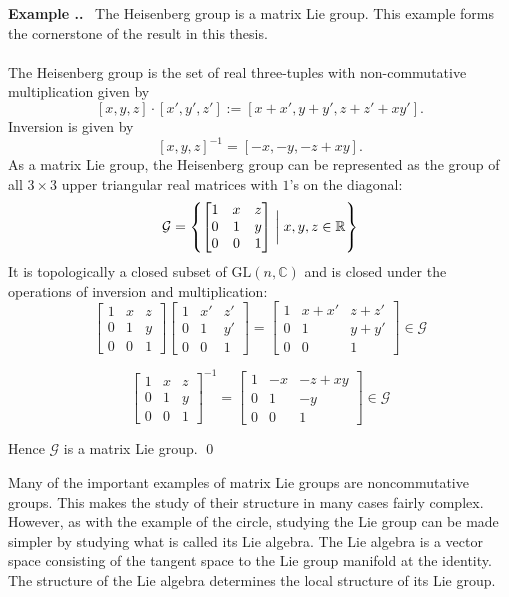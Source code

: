 \documentclass[honours]{UNSWthesis}
\newcommand{\R}{\mathbb{R}}
\newcommand{\C}{\mathbb{C}}
\newcommand{\G}{\mathcal{G}}
\newcommand{\1}{\mathbf{e}_{1}}
\newcommand{\2}{\mathbf{e}_{3}}
\newcommand{\3}{\mathbf{e}_{3}}
\newcounter{Item}[section]
\newenvironment{Example}{\medskip
                            \refstepcounter{Item}
                            \noindent
                           {\bf Example \thesection.\theItem.}\ }
                           {\qed}
\begin{document}
\begin{Example}\label{Heisenberg Group}
The Heisenberg group is a matrix Lie group. This example forms the cornerstone of the result in this thesis.
\paragraph
{\noindent}The Heisenberg group is the set of real three-tuples with non-commutative multiplication given by
\[
[x,y,z]\cdot[x', y', z'] := [x+x', y+y', z+z' + xy'].
\]
Inversion is given by 
\[ [x,y,z]^{-1}= [-x, -y, -z+xy] .\]
As a matrix Lie group, the Heisenberg group can be represented as the group of all $ 3\times 3 $ upper triangular real matrices with $1$'s on the diagonal:
\[
 \G= \left\{ \begin{bmatrix} 1 & x & z \\ 0 & 1 & y \\ 0 & 0 & 1 \end{bmatrix} \biggm| x,y, z \in \R \right\} 
\]
It is topologically a closed subset of $\mathrm{GL}(n,\C)$ and is closed under the operations of inversion and multiplication:
\[
\begin{bmatrix} 1 & x & z \\ 0 & 1 & y \\ 0 & 0 & 1 \end{bmatrix}
\begin{bmatrix} 1 & x' & z' \\ 0 & 1 & y' \\ 0 & 0 & 1 \end{bmatrix}
= \begin{bmatrix} 1 & x+x' & z+z' \\ 0 & 1 & y+y' \\ 0 & 0 & 1 \end{bmatrix}
\in \G
\] 

\[
\begin{bmatrix} 1 & x & z \\ 0 & 1 & y \\ 0 & 0 & 1 \end{bmatrix}^{-1}
= \begin{bmatrix} 1 & -x & -z+xy \\ 0 & 1 & -y \\ 0 & 0 & 1 \end{bmatrix}
\in \G
\]

Hence $\G$ is a matrix Lie group.
\end{Example}

Many of the important examples of matrix Lie groups are noncommutative groups. This makes the study of their structure in many 
cases fairly complex. However, as with the example of the circle, studying the Lie group can be made simpler by studying what is called its Lie algebra. The Lie algebra is a vector space consisting of the tangent space to the Lie group manifold at the identity. The structure of the Lie algebra determines the local structure of its Lie group.
\end{document}
